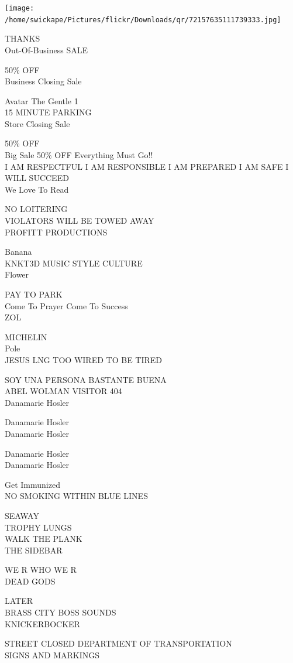 \documentclass[10pt,letterpaper]{article}
\begin{document}
\texttt{[image: /home/swickape/Pictures/flickr/Downloads/qr/72157635111739333.jpg]}
\

THANKS\\
Out{-}Of{-}Business SALE

50\% OFF\\
Business Closing Sale

Avatar The Gentle 1\\
15 MINUTE PARKING\\
Store Closing Sale

50\% OFF\\
Big Sale 50\% OFF Everything Must Go!!\\
I AM RESPECTFUL I AM RESPONSIBLE I AM PREPARED I AM SAFE I WILL SUCCEED\\
We Love To Read

NO LOITERING\\
VIOLATORS WILL BE TOWED AWAY\\
PROFITT PRODUCTIONS

Banana\\
KNKT3D MUSIC STYLE CULTURE\\
Flower

PAY TO PARK\\
Come To Prayer Come To Success\\
ZOL

MICHELIN\\
Pole\\
JESUS LNG TOO WIRED TO BE TIRED

SOY UNA PERSONA BASTANTE BUENA\\
ABEL WOLMAN VISITOR 404\\
Danamarie Hosler

Danamarie Hosler\\
Danamarie Hosler

Danamarie Hosler\\
Danamarie Hosler

Get Immunized\\
NO SMOKING WITHIN BLUE LINES

SEAWAY\\
TROPHY LUNGS\\
WALK THE PLANK\\
THE SIDEBAR

WE R WHO WE R\\
DEAD GODS

LATER\\
BRASS CITY BOSS SOUNDS\\
KNICKERBOCKER

STREET CLOSED DEPARTMENT OF TRANSPORTATION\\
SIGNS AND MARKINGS
\end{document}
